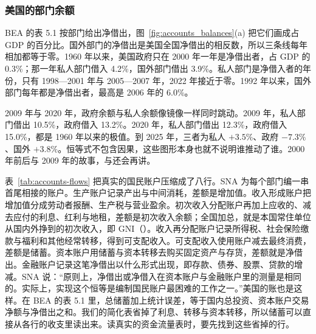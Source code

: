 \subsubsection{美国的部门余额}
BEA 的表 5.1 按部门给出净借出，图~\ref{fig:accounts_balances}(a) 把它们画成占 GDP 的百分比。国外部门的净借出是美国全国净借出的相反数，所以三条线每年相加都等于零。1960 年以来，美国政府只在 2000 年一年是净借出者，占 GDP 的 0.3\%；那一年私人部门借入 4.2\%，国外部门借出 3.9\%。私人部门是净借入者的年份，只有 1998—2001 年与 2005—2007 年，2022 年接近于零。1992 年以来，国外部门每年都是净借出者，最高是 2006 年的 6.0\%。

2009 年与 2020 年，政府余额与私人余额像镜像一样同时跳动。2009 年，私人部门借出 10.5\%，政府借入 13.2\%。2020 年，私人部门借出 12.3\%，政府借入 15.0\%，都是 1960 年以来的极值。到 2025 年，三者为私人 $+3.5\%$、政府 $-7.3\%$、国外 $+3.8\%$\cite{bea2026}。恒等式不包含因果，这些图形本身也就不说明谁推动了谁。2000 年前后与 2009 年的故事，与还会再讲。


\begin{deeper}
表~\ref{tab:accounts-flows} 把真实的国民账户压缩成了八行。SNA 为每个部门编一串首尾相接的账户。生产账户记录产出与中间消耗，差额是增加值。收入形成账户把增加值分成劳动者报酬、生产税与营业盈余。初次收入分配账户再加上应收的、减去应付的利息、红利与地租，差额是初次收入余额；全国加总，就是本国常住单位从国内外挣到的初次收入，即 GNI（）。收入再分配账户记录所得税、社会保险缴款与福利和其他经常转移，得到可支配收入。可支配收入使用账户减去最终消费，差额是储蓄。资本账户用储蓄与资本转移去购买固定资产与存货，差额就是净借出。金融账户记录这笔净借出以什么形式出现，即存款、债券、股票、贷款的增减。SNA 说：“原则上，净借出或净借入在资本账户与金融账户里的测量是相同的。实际上，实现这个恒等是编制国民账户最困难的工作之一。”\cite{sna2008}美国的账也是这样。在 BEA 的表 5.1 里，总储蓄加上统计误差，等于国内总投资、资本账户交易净额与净借出之和\cite{bea2026}。我们的简化表省掉了利息、转移与资本转移，所以储蓄可以直接从各行的收支里读出来。读真实的资金流量表时，要先找到这些省掉的行。
\end{deeper}

